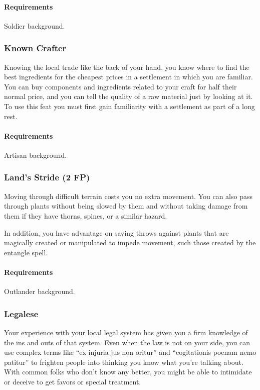     \paragraph{Requirements} Soldier background.
\subsubsection{Known Crafter} \label{feat::knowncrafter}
    Knowing the local trade like the back of your hand, you know where to find the best ingredients for the cheapest prices in a settlement in which you are familiar.
    You can buy components and ingredients related to your craft for half their normal price, and you can tell the quality of a raw material just by looking at it.
    To use this feat you must first gain familiarity with a settlement as part of a long rest.
    \paragraph{Requirements} Artisan background.
\subsubsection{Land's Stride (2 FP)} \label{feat::landsstride}
    Moving through difficult terrain costs you no extra movement.
    You can also pass through plants without being slowed by them and without taking damage from them if they have thorns, spines, or a similar hazard.

    In addition, you have advantage on saving throws against plants that are magically created or manipulated to impede movement, such those created by the entangle spell.
    \paragraph{Requirements} Outlander background.
\subsubsection{Legalese} \label{feat::legalese}
    Your experience with your local legal system has given you a firm knowledge of the ins and outs of that system.
    Even when the law is not on your side, you can use complex terms like ``ex injuria jus non oritur'' and ``cogitationis poenam nemo patitur'' to frighten people into thinking you know what you're talking about.
    With common folks who don't know any better, you might be able to intimidate or deceive to get favors or special treatment.
